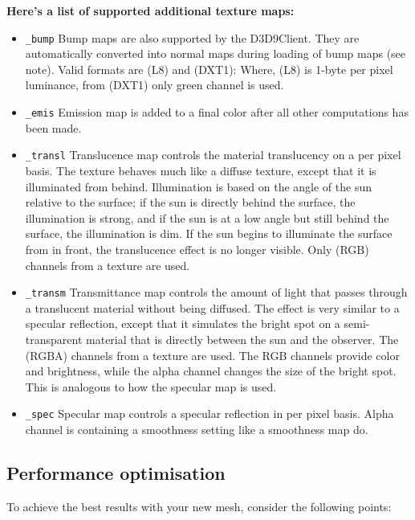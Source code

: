 \documentclass[Orbiter Developer Manual.tex]{subfiles}
\begin{document}
\textbf{Here's a list of supported additional texture maps:}
\begin{itemize}
\item	\texttt{\_bump} Bump maps are also supported by the D3D9Client. They are automatically converted into normal maps during loading of bump maps (see note). Valid formats are (L8) and (DXT1):  Where, (L8) is 1-byte per pixel luminance, from (DXT1) only green channel is used.
\item	\texttt{\_emis} Emission map is added to a final color after all other computations has been made. 
\item	\texttt{\_transl} Translucence map controls the material translucency on a per pixel basis. The texture behaves much like a diffuse texture, except that it is illuminated from behind. Illumination is based on the angle of the sun relative to the surface; if the sun is directly behind the surface, the illumination is strong, and if the sun is at a low angle but still behind the surface, the illumination is dim. If the sun begins to illuminate the surface from in front, the translucence effect is no longer visible. Only (RGB) channels from a texture are used. 
\item	\texttt{\_transm} Transmittance map controls the amount of light that passes through a translucent material without being diffused. The effect is very similar to a specular reflection, except that it simulates the bright spot on a semi-transparent material that is directly between the sun and the observer. The (RGBA) channels from a texture are used. The RGB channels provide color and brightness, while the alpha channel changes the size of the bright spot. This is analogous to how the specular map is used.
\item	\texttt{\_spec} Specular map controls a specular reflection in per pixel basis. Alpha channel is containing a smoothness setting like a smoothness map do.
\end{itemize}

\break
\subsection{Performance optimisation}
To achieve the best results with your new mesh, consider the following points:
\end{document}
